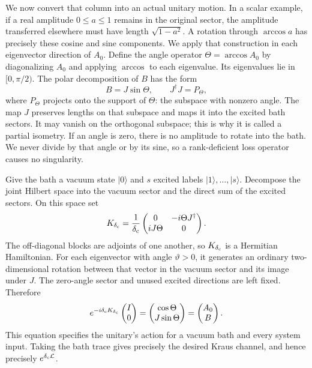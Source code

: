\documentclass[11pt,a4paper]{article}
\numberwithin{equation}{section}
\theoremstyle{remark}
\begin{document}
We now convert that column into an actual unitary motion. In a scalar
example, if a real amplitude $0\le a\le1$ remains in the original sector, the amplitude
transferred elsewhere must have length $\sqrt{1-a^2}$. A rotation through
$\arccos a$ has precisely these cosine and sine components. We apply
that construction in each eigenvector direction of $A_0$. Define the angle
operator $\Theta=\arccos A_0$ by diagonalizing $A_0$ and applying
$\arccos$ to each eigenvalue. Its eigenvalues lie in $[0,\pi/2)$.
The polar decomposition of $B$ has the form
\begin{equation}
 B=J\sin\Theta,
 \qquad J^\dagger J=P_\Theta,
 \label{sim:polar}
\end{equation}
where $P_\Theta$ projects onto the support of $\Theta$: the subspace
with nonzero angle. The map $J$ preserves lengths on that subspace and
maps it into the excited bath sectors. It may vanish on the orthogonal
subspace; this is why it is called a partial isometry. If an angle is
zero, there is no amplitude to rotate into the bath. We never divide by
that angle or by its sine, so a rank-deficient loss operator causes no
singularity.

Give the bath a vacuum state $|0\rangle$ and $s$ excited labels
$|1\rangle,\ldots,|s\rangle$. Decompose the joint Hilbert space into
the vacuum sector and the direct sum of the excited sectors. On this
space set
\begin{equation}
 K_{\delta_{\rm c}}=\frac1{\delta_{\rm c}}
 \begin{pmatrix}
 0&-i\Theta J^\dagger\\
 iJ\Theta&0
 \end{pmatrix}.
 \label{sim:rotation-generator}
\end{equation}
The off-diagonal blocks are adjoints of one another, so $K_{\delta_{\rm c}}$ is a
Hermitian Hamiltonian. For each eigenvector with angle $\vartheta>0$,
it generates an ordinary two-dimensional rotation between that vector
in the vacuum sector and its image under $J$. The zero-angle sector
and unused excited directions are left fixed. Therefore
\begin{equation}
 e^{-i\delta_{\rm c}K_{\delta_{\rm c}}}\begin{pmatrix}I\\0\end{pmatrix}
 =\begin{pmatrix}\cos\Theta\\J\sin\Theta\end{pmatrix}
 =\begin{pmatrix}A_0\\B\end{pmatrix}.
 \label{sim:rotation-column}
\end{equation}
This equation specifies the unitary's action for a vacuum bath and every
system input. Taking the bath trace gives precisely the desired Kraus
channel, and hence precisely $e^{\delta_{\rm c}\mathcal L}$.
\end{document}

